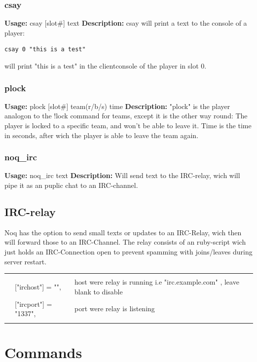 \documentclass[12pt,a4paper]{article}
\begin{document}
\subsubsection{csay}
\textbf{Usage:} \hfill csay [slot\#] text \linebreak
\textbf{Description:} \linebreak
csay will print a text to the console of a player:
\begin{lstlisting}
csay 0 "this is a test"
\end{lstlisting}
will print "this is a test" in the clientconsole of the player in slot 0.

\subsubsection{plock}
\textbf{Usage:} \hfill plock [slot\#] team(r/b/s) time \linebreak
\textbf{Description:} \linebreak
"plock" is the player analogon to the !lock command for teams, except it is the other way round:
The player is locked to a specific team, and won't be able to leave it.
Time is the time in seconds, after wich the player is able to leave the team again.

\subsubsection{noq_irc}
\textbf{Usage:} \hfill noq_irc text\linebreak
\textbf{Description:} \linebreak
Will send text to the IRC-relay, wich will pipe it as an puplic chat to an IRC-channel.

\subsection{IRC-relay}
Noq has the option to send small texts or updates to an IRC-Relay, wich then will forward those to an IRC-Channel.
The relay consists of an ruby-script wich just holds an IRC-Connection open to prevent spamming with joins/leaves during server restart.

\begin{tabular}{l l|l}
\hline & & \\
 & 	["irchost"] = "",  & host were relay is running i.e "irc.example.com" , leave blank to disable\\
 &	["ircport"] = "1337", &  port were relay is listening\\
 & & \\
 \hline
\end{tabular}

\section{Commands}

\newcommand{\inclkwcmds}{ }
\newcommand{\inclkwadmins}{ }

\ifthenelse{\boolean{onKW}}{\inclkwcmds}{}
\ifthenelse{\boolean{onKW}}{\inclkwadmins}{}
\end{document}
